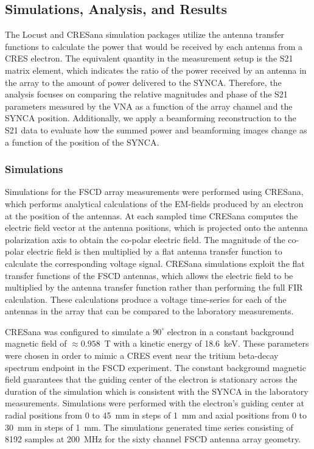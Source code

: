 \subsection{Simulations, Analysis, and Results}

The Locust and CRESana simulation packages utilize the antenna transfer functions to calculate the power that would be received by each antenna from a CRES electron. The equivalent quantity in the measurement setup is the S21 matrix element, which indicates the ratio of the power received by an antenna in the array to the amount of power delivered to the SYNCA. Therefore, the analysis focuses on comparing the relative magnitudes and phase of the S21 parameters measured by the VNA as a function of the array channel and the SYNCA position. Additionally, we apply a beamforming reconstruction to the S21 data to evaluate how the summed power and beamforming images change as a function of the position of the SYNCA.

\subsubsection{Simulations}

Simulations for the FSCD array measurements were performed using CRESana, which performs analytical calculations of the EM-fields produced by an electron at the position of the antennas. At each sampled time CRESana computes the electric field vector at the antenna positions, which is projected onto the antenna polarization axis to obtain the co-polar electric field. The magnitude of the co-polar electric field is then multiplied by a flat antenna transfer function to calculate the corresponding voltage signal. CRESana simulations exploit the flat transfer functions of the FSCD antennas, which allows the electric field to be multiplied by the antenna transfer function rather than performing the full FIR calculation. These calculations produce a voltage time-series for each of the antennas in the array that can be compared to the laboratory measurements.

CRESana was configured to simulate a $90^\circ$ electron in a constant background magnetic field of $\approx0.958$~T with a kinetic energy of 18.6~keV. These parameters were chosen in order to mimic a CRES event near the tritium beta-decay spectrum endpoint in the FSCD experiment. The constant background magnetic field guarantees that the guiding center of the electron is stationary across the duration of the simulation which is consistent with the SYNCA in the laboratory measurements. Simulations were performed with the electron's guiding center at radial positions from 0 to 45~mm in steps of 1~mm and axial positions from 0 to 30~mm in steps of 1~mm. The simulations generated time series consisting of 
8192 samples at 200~MHz for the sixty channel FSCD antenna array geometry.

